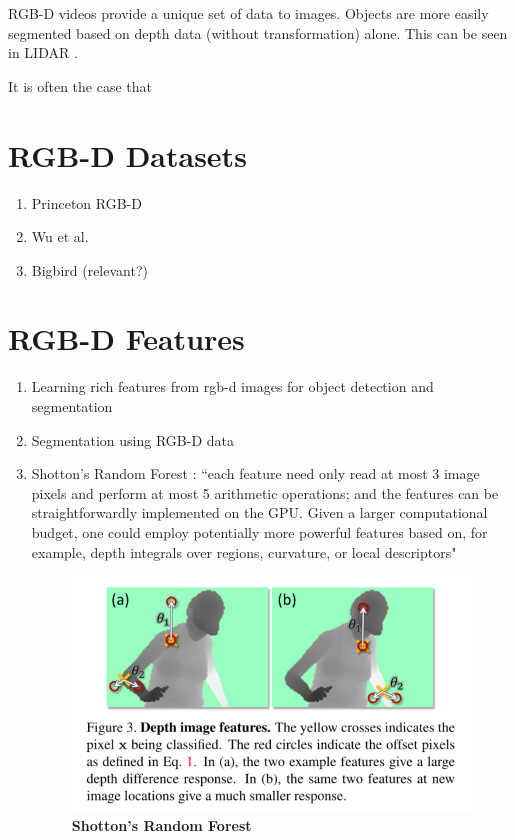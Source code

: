 RGB-D videos provide a unique set of data to images. Objects are more easily
segmented based on depth data (without transformation) alone. This can be seen
in LIDAR \cite{morton2013multi}.

It is often the case that 


\section{RGB-D Datasets}
\begin{enumerate}
\item Princeton RGB-D \cite{song2013tracking}
\item Wu et al. \cite{wu2013online}
\item Bigbird \cite{singh2014bigbird} (relevant?)
\end{enumerate}
\section{RGB-D Features}
\begin{enumerate}
\item Learning rich features from rgb-d images for object detection and segmentation \cite{gupta2014learning}
\item Segmentation using RGB-D data \cite{abramov2012depth}
\item Shotton's Random Forest \cite{shotton2013real}: ``each feature need only
read at most 3 image pixels and perform at most 5 arithmetic
operations; and the features can be straightforwardly implemented
on the GPU. Given a larger computational budget,
one could employ potentially more powerful features based
on, for example, depth integrals over regions, curvature, or
local descriptors"

\begin{figure}
   \hspace{-2mm}
   \includegraphics[width=0.45\linewidth]{figures/shotton2013real_features.png}
   \caption{\textbf{Shotton's Random Forest} \cite{shotton2013real}}
   \label{fig:shotton2013real_features}
\end{figure}
\end{enumerate}


